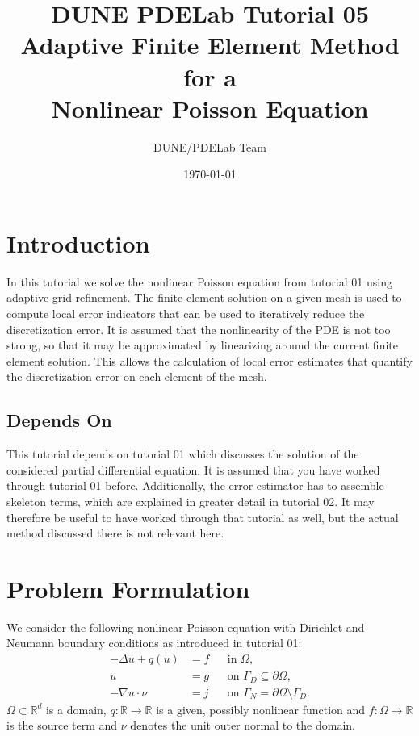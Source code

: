 \documentclass[a4paper,12pt]{article}
\title{DUNE PDELab Tutorial 05 \\ 
Adaptive Finite Element Method for a\\
Nonlinear Poisson Equation}
\author{DUNE/PDELab Team}
\date{\today}
\begin{document}
\maketitle
\tableofcontents
\clearpage

\section{Introduction}

In this tutorial we solve the nonlinear Poisson equation from tutorial 01 using
adaptive grid refinement. The finite element solution on a given mesh is used to
compute local error indicators that can be used to iteratively reduce the
discretization error. It is assumed that the nonlinearity of the PDE is not too
strong, so that it may be approximated by linearizing around the current finite
element solution. This allows the calculation of local error estimates
that quantify the discretization error on each element of the mesh.

\subsection*{Depends On} This tutorial depends on tutorial 01 which discusses
the solution of the considered partial differential equation. It is assumed that
you have worked through tutorial 01 before. Additionally, the error estimator has
to assemble skeleton terms, which are explained in greater detail in tutorial 02.
It may therefore be useful to have worked through that tutorial as well, but the
actual method discussed there is not relevant here.

\section{Problem Formulation}

We consider the following nonlinear Poisson equation with
Dirichlet and Neumann boundary conditions as introduced in tutorial 01:
\begin{subequations} \label{eq:ProblemStrong}
\begin{align}
-\Delta u + q(u) &= f &&\text{in $\Omega$},\\
u &= g &&\text{on $\Gamma_D\subseteq\partial\Omega$},\\
-\nabla u\cdot \nu &= j &&\text{on $\Gamma_N=\partial\Omega\setminus\Gamma_D$}.
\end{align}
\end{subequations}
$\Omega\subset\mathbb{R}^d$ is a domain, $q:\mathbb{R}\to\mathbb{R}$ is a given, possibly
nonlinear function and $f: \Omega\to\mathbb{R}$ is the source term and
$\nu$ denotes the unit outer normal to the domain.
\end{document}

